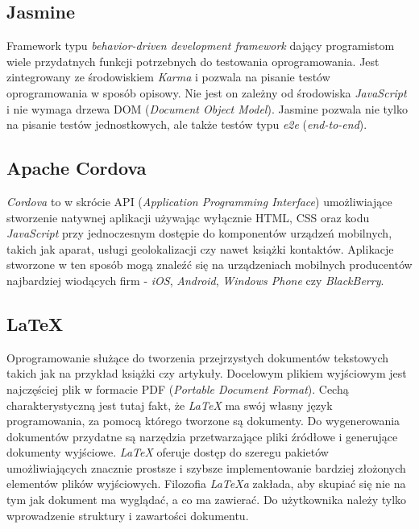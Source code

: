 \subsection{Jasmine}
Framework typu \textit{behavior-driven development framework} dający programistom wiele przydatnych funkcji potrzebnych do testowania oprogramowania. Jest zintegrowany ze środowiskiem \textit{Karma} i pozwala na pisanie testów oprogramowania w sposób opisowy. Nie jest on zależny od środowiska \textit{JavaScript} i nie wymaga drzewa DOM (\textit{Document Object Model}). Jasmine pozwala nie tylko na pisanie testów jednostkowych, ale także testów typu \textit{e2e} (\textit{end-to-end}). 

\subsection{Apache Cordova}
\textit{Cordova} to w skrócie API (\textit{Application Programming Interface}) umożliwiające stworzenie natywnej aplikacji używając wyłącznie HTML, CSS oraz kodu \textit{JavaScript} przy jednoczesnym dostępie do komponentów urządzeń mobilnych, takich jak aparat, usługi geolokalizacji czy nawet książki kontaktów. Aplikacje stworzone w ten sposób mogą znaleźć się na urządzeniach mobilnych producentów najbardziej wiodących firm - \textit{iOS}, \textit{Android}, \textit{Windows Phone} czy \textit{BlackBerry}.

\subsection{LaTeX}
Oprogramowanie służące do tworzenia przejrzystych dokumentów tekstowych takich jak na przykład książki czy artykuły. Docelowym plikiem wyjściowym jest najczęściej plik w formacie PDF (\textit{Portable Document Format}). Cechą charakterystyczną jest tutaj fakt, że \textit{LaTeX} ma swój własny język programowania, za pomocą którego tworzone są dokumenty. Do wygenerowania dokumentów przydatne są narzędzia przetwarzające pliki źródłowe i generujące dokumenty wyjściowe. \textit{LaTeX} oferuje dostęp do szeregu pakietów umożliwiających znacznie prostsze i szybsze implementowanie bardziej złożonych elementów plików wyjściowych. Filozofia \textit{LaTeXa} zakłada, aby skupiać się nie na tym jak dokument ma wyglądać, a co ma zawierać. Do użytkownika należy tylko wprowadzenie struktury i zawartości dokumentu. 


